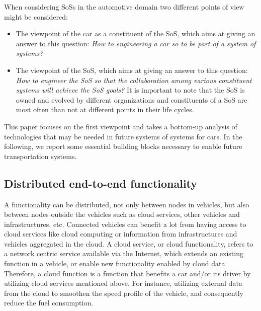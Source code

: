 \documentclass{llncs}
\begin{document}
When considering SoSs in the automotive domain two different points of view might be considered: 

\begin{itemize}
\item The viewpoint of the car as a constituent of the SoS, which aims at giving an answer to this question: {\em How to engineering a car so to be part of a system of systems?}
\item The viewpoint of the SoS, which aims at giving an answer to this question: {\em How to engineer the SoS so that the collaboration among various constituent systems will achieve the SoS goals?} It is important to note that the SoS is owned and evolved by different organizations and constituents of a SoS are most often than not at different points in their life cycles. 
\end{itemize}

This paper focuses on the first viewpoint and takes a bottom-up analysis of technologies that may be needed in future systems of systems for cars. %
In the following, we report some essential building blocks necessary to enable future transportation systems.

\subsection*{Distributed end-to-end functionality} 

A functionality can be distributed, not only between nodes in vehicles, but also between nodes outside the vehicles such as cloud services, other vehicles and infrastructures, etc. Connected vehicles can benefit a lot from having access to cloud services like cloud computing or information from infrastructures and vehicles aggregated in the cloud. A cloud service, or cloud functionality, refers to a network centric service available via the Internet, which extends an existing function in a vehicle, or enable new functionality enabled by cloud data. Therefore, a cloud function is a function that benefits a car and/or its driver by utilizing cloud services mentioned above. For instance, utilizing external data from the cloud to smoothen the speed profile of the vehicle, and consequently reduce the fuel consumption.
\end{document}
